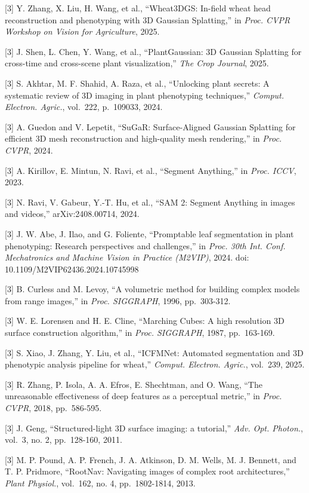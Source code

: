 \documentclass[11pt,a4paper]{article}
\begin{document}
{[}3{]} Y. Zhang, X. Liu, H. Wang, et al., ``Wheat3DGS: In-field wheat
head reconstruction and phenotyping with 3D Gaussian Splatting,'' in
\emph{Proc. CVPR Workshop on Vision for Agriculture}, 2025.

{[}3{]} J. Shen, L. Chen, Y. Wang, et al., ``PlantGaussian: 3D Gaussian
Splatting for cross-time and cross-scene plant visualization,''
\emph{The Crop Journal}, 2025.

{[}3{]} S. Akhtar, M. F. Shahid, A. Raza, et al., ``Unlocking plant
secrets: A systematic review of 3D imaging in plant phenotyping
techniques,'' \emph{Comput. Electron. Agric.}, vol.~222, p.~109033,
2024.

{[}3{]} A. Guedon and V. Lepetit, ``SuGaR: Surface-Aligned Gaussian
Splatting for efficient 3D mesh reconstruction and high-quality mesh
rendering,'' in \emph{Proc. CVPR}, 2024.

{[}3{]} A. Kirillov, E. Mintun, N. Ravi, et al., ``Segment Anything,''
in \emph{Proc. ICCV}, 2023.

{[}3{]} N. Ravi, V. Gabeur, Y.-T. Hu, et al., ``SAM 2: Segment Anything
in images and videos,'' arXiv:2408.00714, 2024.

{[}3{]} J. W. Abe, J. Ilao, and G. Foliente, ``Promptable leaf
segmentation in plant phenotyping: Research perspectives and
challenges,'' in \emph{Proc. 30th Int. Conf. Mechatronics and Machine
Vision in Practice (M2VIP)}, 2024. doi: 10.1109/M2VIP62436.2024.10745998

{[}3{]} B. Curless and M. Levoy, ``A volumetric method for building
complex models from range images,'' in \emph{Proc. SIGGRAPH}, 1996,
pp.~303-312.

{[}3{]} W. E. Lorensen and H. E. Cline, ``Marching Cubes: A high
resolution 3D surface construction algorithm,'' in \emph{Proc.
SIGGRAPH}, 1987, pp.~163-169.

{[}3{]} S. Xiao, J. Zhang, Y. Liu, et al., ``ICFMNet: Automated
segmentation and 3D phenotypic analysis pipeline for wheat,''
\emph{Comput. Electron. Agric.}, vol.~239, 2025.

{[}3{]} R. Zhang, P. Isola, A. A. Efros, E. Shechtman, and O. Wang,
``The unreasonable effectiveness of deep features as a perceptual
metric,'' in \emph{Proc. CVPR}, 2018, pp.~586-595.

{[}3{]} J. Geng, ``Structured-light 3D surface imaging: a tutorial,''
\emph{Adv. Opt. Photon.}, vol.~3, no. 2, pp.~128-160, 2011.

{[}3{]} M. P. Pound, A. P. French, J. A. Atkinson, D. M. Wells, M. J.
Bennett, and T. P. Pridmore, ``RootNav: Navigating images of complex
root architectures,'' \emph{Plant Physiol.}, vol.~162, no. 4,
pp.~1802-1814, 2013.
\end{document}
